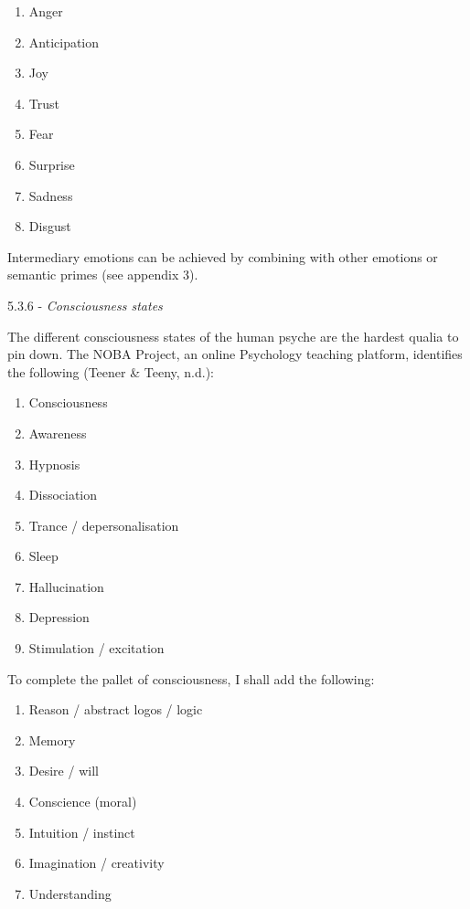\begin{enumerate}
\item   Anger 

\item   Anticipation 

\item   Joy 

\item   Trust 

\item   Fear 

\item   Surprise 
	
\item   Sadness 

\item   Disgust
\end{enumerate}

Intermediary emotions can be achieved by combining with other emotions or semantic primes (see appendix 3). 

{5.3.6 - \it Consciousness states}

The different consciousness states of the human psyche are the hardest qualia to pin down. The NOBA Project, an online Psychology teaching platform, identifies the following (Teener \& Teeny, n.d.): 

\begin{enumerate}
\item   Consciousness 

\item   Awareness 

\item   Hypnosis 

\item   Dissociation 

\item   Trance / depersonalisation 

\item   Sleep 

\item   Hallucination 

\item   Depression 

\item   Stimulation / excitation
\end{enumerate}
 

\noindent To complete the pallet of consciousness, I shall add the following: 
\setcounter{enumi}{9}
\begin{enumerate}
\item   Reason / abstract logos / logic 

\item   Memory 

\item   Desire / will 

\item   Conscience (moral) 

\item   Intuition / instinct 

\item   Imagination / creativity 

\item   Understanding
\end{enumerate}

